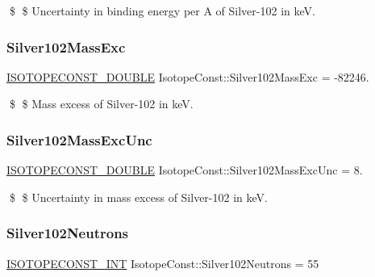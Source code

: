 \$ \$ Uncertainty in binding energy per A of Silver-\/102 in keV. \mbox{\label{group___isotope_const-_silver-_ag102_ga97b06ed26590112e4aec4bb487f8bbb2}} 
\subsubsection{\texorpdfstring{Silver102\+Mass\+Exc}{Silver102MassExc}}
{\footnotesize\ttfamily \mbox{\hyperlink{group___isotope_const-_macros_ga8f45a7272ce02c0b4c65c44636ed719a}{I\+S\+O\+T\+O\+P\+E\+C\+O\+N\+S\+T\+\_\+\+D\+O\+U\+B\+LE}} Isotope\+Const\+::\+Silver102\+Mass\+Exc = -\/82246.}

\$ \$ Mass excess of Silver-\/102 in keV. \mbox{\label{group___isotope_const-_silver-_ag102_ga2e30c02bc14cd4d429eadb75ff5bb13b}} 
\subsubsection{\texorpdfstring{Silver102\+Mass\+Exc\+Unc}{Silver102MassExcUnc}}
{\footnotesize\ttfamily \mbox{\hyperlink{group___isotope_const-_macros_ga8f45a7272ce02c0b4c65c44636ed719a}{I\+S\+O\+T\+O\+P\+E\+C\+O\+N\+S\+T\+\_\+\+D\+O\+U\+B\+LE}} Isotope\+Const\+::\+Silver102\+Mass\+Exc\+Unc = 8.}

\$ \$ Uncertainty in mass excess of Silver-\/102 in keV. \mbox{\label{group___isotope_const-_silver-_ag102_ga1dad5142ce4715224acaf442f614d98f}} 
\subsubsection{\texorpdfstring{Silver102\+Neutrons}{Silver102Neutrons}}
{\footnotesize\ttfamily \mbox{\hyperlink{group___isotope_const-_macros_ga5f18360b3e99483a35c32d789e62621c}{I\+S\+O\+T\+O\+P\+E\+C\+O\+N\+S\+T\+\_\+\+I\+NT}} Isotope\+Const\+::\+Silver102\+Neutrons = 55}


